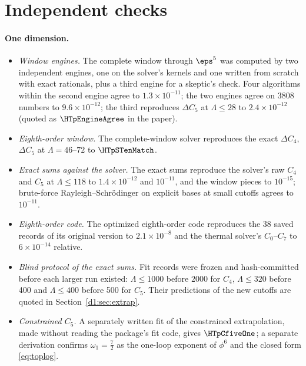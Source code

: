 \section{Independent checks}\label{sec:checks}

\paragraph{One dimension.}
\begin{itemize}
\item \emph{Window engines.} The complete window through $\eps^5$ was computed by two independent engines, one on the
 solver's kernels and one written from scratch with exact rationals, plus a third engine for a skeptic's check. Four
 algorithms within the second engine agree to $1.3\times10^{-11}$; the two engines agree on 3808 numbers to
 $9.6\times10^{-12}$; the third reproduces $\Delta C_5$ at $\Lambda\le28$ to $2.4\times10^{-12}$
 (quoted as $\HTpEngineAgree$ in the paper).
\item \emph{Eighth-order window.} The complete-window solver reproduces the exact $\Delta C_4$, $\Delta C_5$ at
 $\Lambda=46$--$72$ to $\HTpSTenMatch$.
\item \emph{Exact sums against the solver.} The exact sums reproduce the solver's raw $C_4$ and $C_5$ at
 $\Lambda\le118$ to $1.4\times10^{-12}$ and $10^{-11}$, and the window pieces to $10^{-15}$; brute-force
 Rayleigh--Schr\"odinger on explicit bases at small cutoffs agrees to $10^{-11}$.
\item \emph{Eighth-order code.} The optimized eighth-order code reproduces the 38 saved records of its original
 version to $2.1\times10^{-8}$ and the thermal solver's $C_0$--$C_7$ to $6\times10^{-14}$ relative.
\item \emph{Blind protocol of the exact sums.} Fit records were frozen and hash-committed before each larger run
 existed: $\Lambda\le1000$ before $2000$ for $C_4$, $\Lambda\le320$ before 400 and $\Lambda\le400$ before 500 for $C_5$.
 Their predictions of the new cutoffs are quoted in Section~\ref{d1:sec:extrap}.
\item \emph{Constrained $C_5$.} A separately written fit of the constrained extrapolation, made without reading the
 package's fit code, gives $\HTpCfiveOne$; a separate derivation confirms $\omega_1=\tfrac72$ as the one-loop
 exponent of $\phi^6$ and the closed form \eqref{eq:toplog}.
\end{itemize}

